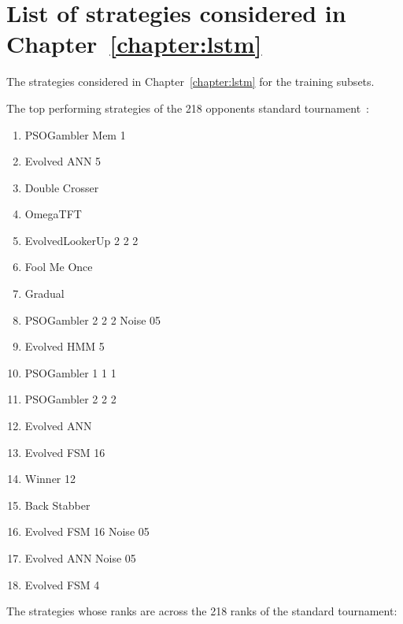 \section{List of strategies considered in Chapter~\ref{chapter:lstm}}\label{appendix:training_sets_strategies}

The strategies considered in Chapter~\ref{chapter:lstm} for the training subsets.

The top \topstrategies performing strategies of the 218 opponents standard
tournament~\cite{std_tournament_results}:

\begin{multicols}{3}
\begin{enumerate}
    \item PSOGambler Mem 1
    \item Evolved ANN 5
    \item Double Crosser
    \item OmegaTFT
    \item EvolvedLookerUp 2 2 2
    \item Fool Me Once
    \item Gradual
    \item PSOGambler 2 2 2 Noise 05
    \item Evolved HMM 5
    \item PSOGambler 1 1 1
    \item PSOGambler 2 2 2
    \item Evolved ANN
    \item Evolved FSM 16
    \item Winner 12
    \item Back Stabber
    \item Evolved FSM 16 Noise 05
    \item Evolved ANN Noise 05
    \item Evolved FSM 4
\end{enumerate}
\end{multicols}

The \acrossstrategies strategies whose ranks are across the 218 ranks
of the standard tournament:


